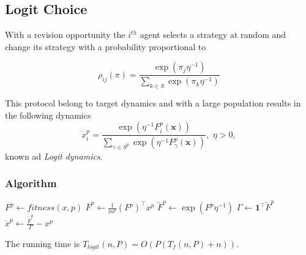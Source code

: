 \documentclass[a4paper,10pt]{article}
\def\th{^{th}}
\newcommand{\bs}[1]{\boldsymbol{#1}}
\def\th{^{th}}
\begin{document}
\subsection{Logit Choice}

With a revision opportunity the $i\th$ agent selects a strategy at random and change its strategy with a probability proportional to 

\begin{equation}
\rho_{ij}(\pi) = \frac{ \exp(\pi_j \eta^{-1} ) }{ \sum_{k \in S} \exp(\pi_k \eta^{-1} ) }
\end{equation}

This protocol belong to target dynamics and with a large population results in the following dynamics
\begin{equation}\label{eq:logit}
 \dot{x}_i^p = \frac{ \exp\left(\eta^{-1} F_i^p (\bs{x}) \right) }{ \sum_{\gamma \in S^p} \exp\left(\eta^{-1} F_\gamma^p (\bs{x}) \right) }, \, \, \eta>0,
\end{equation}
known ad \emph{Logit dynamics}. 



\subsubsection*{Algorithm}

\begin{algorithm}[H]

 \BlankLine
 
  {
  $ F^p \leftarrow fitness(x, p)$\;
  $ \bar{F}^p \leftarrow \frac{1}{m^p} (F^p)^\top x^p$\;
  $ \tilde{F}^p \leftarrow \exp( F^p \eta^{-1} )$\;
  $ \Gamma \leftarrow \boldsymbol{1}^\top \tilde{F}^p $\;
  $ \dot{x}^p \leftarrow \frac{\tilde{F}^p}{\Gamma} - x^p $\;
 }
\end{algorithm}

The running time is $T_{logit}(n,P) = O( P (  T_{f}(n,P) + n) ) $.

\end{document}

